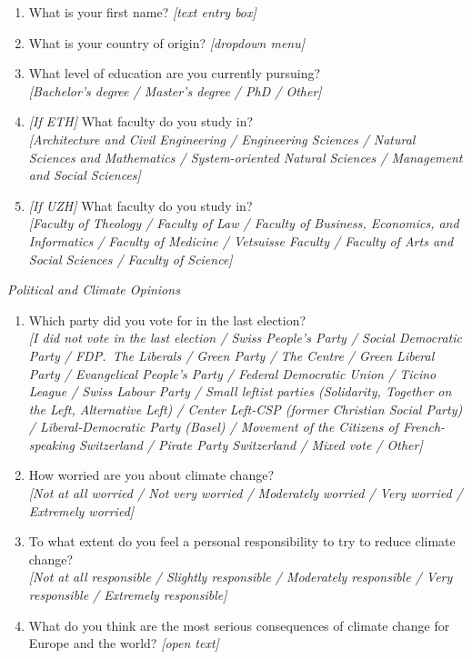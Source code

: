\documentclass[12pt,notitlepage]{article}
\theoremstyle{plain}
\theoremstyle{plain}
\theoremstyle{definition}
\theoremstyle{definition}
\theoremstyle{assumption}
\theoremstyle{plain}
\theoremstyle{plain}
\theoremstyle{plain}
\theoremstyle{plain}
\theoremstyle{definition}%
\theoremstyle{plain}
\theoremstyle{plain}
\theoremstyle{plain}
\theoremstyle{plain}
\begin{document}
\begin{enumerate}
\item What is your first name? \emph{[text entry box]}
\item What is your country of origin? \emph{[dropdown menu]}
\item What level of education are you currently pursuing?\\
\emph{[Bachelor's degree / Master's degree / PhD / Other]}
\item \emph{[If ETH]} What faculty do you study in?\\
\emph{[Architecture and Civil Engineering / Engineering Sciences / Natural Sciences and Mathematics / System-oriented Natural Sciences / Management and Social Sciences]}
\item \emph{[If UZH]} What faculty do you study in?\\
\emph{[Faculty of Theology / Faculty of Law / Faculty of Business, Economics, and Informatics / Faculty of Medicine / Vetsuisse Faculty / Faculty of Arts and Social Sciences / Faculty of Science]}
\end{enumerate}

\vspace{12pt}
\emph{Political and Climate Opinions}

\begin{enumerate}
\item Which party did you vote for in the last election?\\
\emph{[I did not vote in the last election / Swiss People's Party / Social Democratic Party / FDP.~The Liberals / Green Party / The Centre / Green Liberal Party / Evangelical People's Party / Federal Democratic Union / Ticino League / Swiss Labour Party / Small leftist parties (Solidarity, Together on the Left, Alternative Left) / Center Left-CSP (former Christian Social Party) / Liberal-Democratic Party (Basel) / Movement of the Citizens of French-speaking Switzerland / Pirate Party Switzerland / Mixed vote / Other]}
\item How worried are you about climate change?\\
\emph{[Not at all worried / Not very worried / Moderately worried / Very worried / Extremely worried]}
\item To what extent do you feel a personal responsibility to try to reduce climate change?\\
\emph{[Not at all responsible / Slightly responsible / Moderately responsible / Very responsible / Extremely responsible]}
\item What do you think are the most serious consequences of climate change for Europe and the world? \emph{[open text]}
\end{enumerate}
\end{document}
